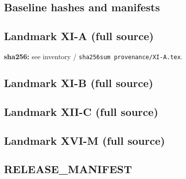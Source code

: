 \documentclass{article}
\begin{document}
\subsection{Baseline hashes and manifests}





\subsection{Landmark XI-A (full source)}
\label{app:XIA}
\textbf{sha256:} see inventory / \texttt{sha256sum provenance/XI-A.tex}.


\subsection{Landmark XI-B (full source)}
\label{app:XIB}


\subsection{Landmark XII-C (full source)}
\label{app:XIIC}


\subsection{Landmark XVI-M (full source)}
\label{app:XVIM}


\subsection{RELEASE\_MANIFEST}
\label{app:manifest}

\end{document}
